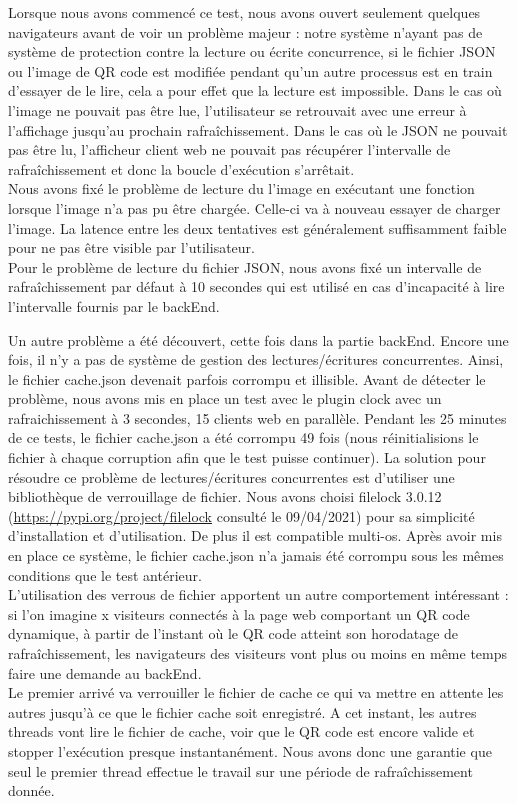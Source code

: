 \documentclass[a4paper,12pt]{article}
\begin{document}
\noindent Lorsque nous avons commencé ce test, nous avons ouvert seulement quelques navigateurs avant de voir un problème majeur : notre système n'ayant pas de système de protection contre la lecture ou écrite concurrence, si le fichier JSON ou l'image de QR code est modifiée pendant qu'un autre processus est en train d'essayer de le lire, cela a pour effet que la lecture est impossible. Dans le cas où l'image ne pouvait pas être lue, l'utilisateur se retrouvait avec une erreur à l'affichage jusqu'au prochain rafraîchissement. Dans le cas où le JSON ne pouvait pas être lu, l'afficheur client web ne pouvait pas récupérer l'intervalle de rafraîchissement et donc la boucle d'exécution s'arrêtait.\\

\noindent Nous avons fixé le problème de lecture du l'image en exécutant une fonction lorsque l'image n'a pas pu être chargée. Celle-ci va à nouveau essayer de charger l'image. La latence entre les deux tentatives est généralement suffisamment faible pour ne pas être visible par l'utilisateur.\\

\noindent Pour le problème de lecture du fichier JSON, nous avons fixé un intervalle de rafraîchissement par défaut à 10 secondes qui est utilisé en cas d'incapacité à lire l'intervalle fournis par le backEnd.

\noindent Un autre problème a été découvert, cette fois dans la partie backEnd. Encore une fois, il n'y a pas de système de gestion des lectures/écritures concurrentes. Ainsi, le fichier cache.json devenait parfois corrompu et illisible. Avant de détecter le problème, nous avons mis en place un test avec le plugin clock avec un rafraichissement à 3 secondes, 15 clients web en parallèle. Pendant les 25 minutes de ce tests, le fichier cache.json a été corrompu 49 fois (nous réinitialisions le fichier à chaque corruption afin que le test puisse continuer). La solution pour résoudre ce problème de lectures/écritures concurrentes est d'utiliser une bibliothèque de verrouillage de fichier. Nous avons choisi filelock 3.0.12 (\url{https://pypi.org/project/filelock} consulté le 09/04/2021) pour sa simplicité d'installation et d'utilisation. De plus il est compatible multi-os. Après avoir mis en place ce système, le fichier cache.json n'a jamais été corrompu sous les mêmes conditions que le test antérieur.\\

\noindent L'utilisation des verrous de fichier apportent un autre comportement intéressant : si l'on imagine x visiteurs connectés à la page web comportant un QR code dynamique, à partir de l'instant où le QR code atteint son horodatage de rafraîchissement, les navigateurs des visiteurs vont plus ou moins en même temps faire une demande au backEnd.\\ Le premier arrivé va verrouiller le fichier de cache ce qui va mettre en attente les autres jusqu'à ce que le fichier cache soit enregistré. A cet instant, les autres threads vont lire le fichier de cache, voir que le QR code est encore valide et stopper l'exécution presque instantanément. Nous avons donc une garantie que seul le premier thread effectue le travail sur une période de rafraîchissement donnée.\\
\end{document}
